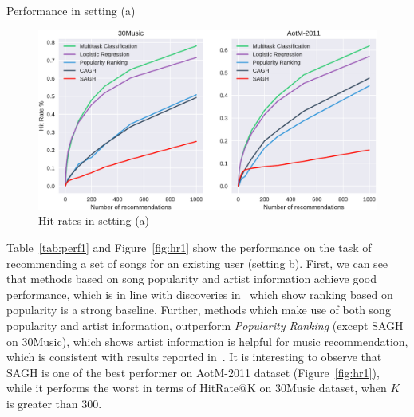 \begin{table}[h]
\centering
\caption{Performance in setting (a)}
\label{tab:perf0}
\resizebox{\columnwidth}{!}{

}
\end{table}

\begin{figure}[h]
\centering
\includegraphics[width=.975\linewidth]{fig/hitrate0.pdf}
\caption{Hit rates in setting (a)}
\label{fig:hr0}
\end{figure}


Table~\ref{tab:perf1} and Figure~\ref{fig:hr1} show the performance on the task of recommending a set of songs for
an existing user (setting b).
First, we can see that methods based on song popularity and artist information achieve good performance,
which is in line with discoveries in~\cite{bonnin2013evaluating,jannach2015beyond,bonnin2015automated} which 
show ranking based on popularity is a strong baseline.
Further, methods which make use of both song popularity and artist information,
outperform {\it Popularity Ranking} (except SAGH on 30Music), which shows artist information is helpful for music recommendation,
which is consistent with results reported in~\cite{bonnin2013evaluating,bonnin2015automated}.
%
It is interesting to observe that SAGH is one of the best performer on AotM-2011 dataset (Figure~\ref{fig:hr1}), 
while it performs the worst in terms of HitRate@K on 30Music dataset, when $K$ is greater than 300.
%


